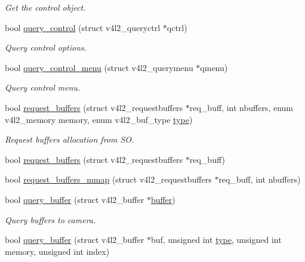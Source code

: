 \begin{DoxyCompactItemize}
\begin{DoxyCompactList}\small\item\em Get the control object. \end{DoxyCompactList}\item 
bool \hyperlink{classv4lcap_acede842207240d9eb3b4a8d99ff32fc4}{query\+\_\+control} (struct v4l2\+\_\+queryctrl $\ast$qctrl)
\begin{DoxyCompactList}\small\item\em Query control options. \end{DoxyCompactList}\item 
bool \hyperlink{classv4lcap_aa23f5ba6c1828dc3af8258d8a33b95e4}{query\+\_\+control\+\_\+menu} (struct v4l2\+\_\+querymenu $\ast$qmenu)
\begin{DoxyCompactList}\small\item\em Query control menu. \end{DoxyCompactList}\item 
bool \hyperlink{classv4lcap_adfe2c7d6382e325a9f4e1ad699c01fc5}{request\+\_\+buffers} (struct v4l2\+\_\+requestbuffers $\ast$req\+\_\+buff, int nbuffers, enum v4l2\+\_\+memory memory, enum v4l2\+\_\+buf\+\_\+type \hyperlink{classstd_1_1conditional_1_1type}{type})
\begin{DoxyCompactList}\small\item\em Request buffers allocation from SO. \end{DoxyCompactList}\item 
bool \hyperlink{classv4lcap_a84e43b6054a1d84002c1d060aef1bf84}{request\+\_\+buffers} (struct v4l2\+\_\+requestbuffers $\ast$req\+\_\+buff)
\item 
bool \hyperlink{classv4lcap_a874905b9c6c785294fa7487a844cb841}{request\+\_\+buffers\+\_\+mmap} (struct v4l2\+\_\+requestbuffers $\ast$req\+\_\+buff, int nbuffers)
\item 
bool \hyperlink{classv4lcap_a238573a18b367ebc812a49f4f1917012}{query\+\_\+buffer} (struct v4l2\+\_\+buffer $\ast$\hyperlink{structv4lcap_1_1buffer}{buffer})
\begin{DoxyCompactList}\small\item\em Query buffers to camera. \end{DoxyCompactList}\item 
bool \hyperlink{classv4lcap_ad3cb2800d0606ec4ade6fd78f52a56cd}{query\+\_\+buffer} (struct v4l2\+\_\+buffer $\ast$buf, unsigned int \hyperlink{classstd_1_1conditional_1_1type}{type}, unsigned int memory, unsigned int index)
\item 

\end{DoxyCompactItemize}
